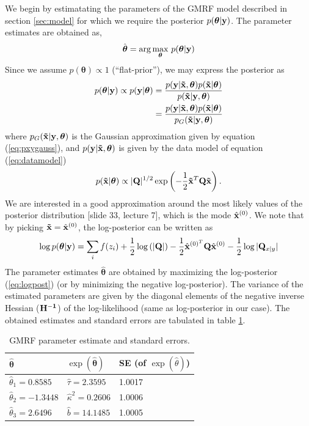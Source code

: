 \documentclass[a4paper,10pt]{article}
\def\bQ{{\bf Q}}
\def\bx{{\bf x}}
\def\by{{\bf y}}
\def\btx{{\bf{\tilde x}}}
\def\btheta{{\boldsymbol \theta}}
\def\bxmode{{\hat \bx^{(0)}}}
\begin{document}
We begin by estimatating the parameters of the GMRF model described in section \ref{sec:model} for which we require the posterior $p(\btheta|\by)$. The parameter estimates are obtained as,
\begin{equation*}
 \hat \btheta = \arg\max_{\btheta} \, p(\btheta|\by)
\end{equation*}
Since we assume $p(\btheta) \propto 1$ (``flat-prior''), we may express the posterior as
\begin{align*}
 p(\btheta|\by) \propto p(\by|\btheta) &= \frac{p(\by|\btx, \btheta) p(\btx|\btheta)}{p(\btx|\by, \btheta)} \\
 &= \frac{p(\by|\btx, \btheta) p(\btx|\btheta)}{p_G(\btx|\by, \btheta)}
\end{align*}
where $p_G(\btx|\by, \btheta)$ is the Gaussian approximation given by equation (\ref{eq:pxygauss}), and $p(\by|\btx, \btheta)$ is given by the data model of equation (\ref{eq:datamodel})
\begin{equation*}
 p(\btx|\btheta) \propto |\bQ|^{1/2} \exp \left(-\frac{1}{2} \btx^T \bQ \btx \right).
\end{equation*}
We are interested in a good approximation around the most likely values of the posterior distribution [slide 33, lecture 7], which is the mode $\hat \bx^{(0)}$. We note that by picking $\btx = \bxmode$, the log-posterior can be written as
\begin{equation}
 \log p(\btheta|\by) = \sum_i f(z_i) + \frac{1}{2} \log\left( |\bQ| \right) - \frac{1}{2} \hat \bx^{(0)^T} \bQ \bxmode - \frac{1}{2} \log |\bQ_{x|y}|
 \label{eq:logpost}
\end{equation}
The parameter estimates $\hat \btheta$ are obtained by maximizing the log-posterior (\ref{eq:logpost}) (or by minimizing the negative log-posterior). The variance of the estimated parameters are given by the diagonal elements of the negative inverse Hessian ($\bf H^{-1}$) of the log-likelihood (same as log-posterior in our case). The obtained estimates and standard errors are tabulated in table \ref{tab:gmrfparest}.	
\begin{table}[H]
\centering
\begin{tabular}{lll}
\hline
{\bf $\hat \btheta$} & {$\exp(\hat \btheta)$} & {\bf SE} (of $\exp(\hat \theta)$) \\
\hline
$\hat \theta_1 =  0.8585$ & $\hat \tau = 2.3595 $ & 1.0017 \\
$\hat \theta_2 = -1.3448$ & $\hat \kappa^2 = 0.2606 $ &  1.0006 \\
$\hat \theta_3 = 2.6496$ & $\hat b = 14.1485$ & 1.0005 \\
\hline
\end{tabular}
\caption{GMRF parameter estimate and standard errors.}
\label{tab:gmrfparest}
\end{table}
\end{document}
